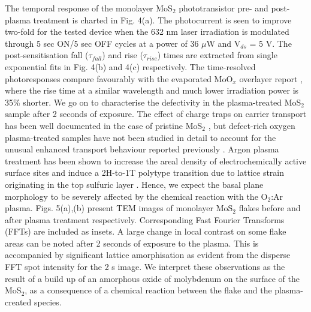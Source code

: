 \documentclass[%
 reprint,
superscriptaddress,
 amsmath,amssymb,
 aps,
prb,
]{revtex4-1}
\begin{document}
\indent The temporal response of the monolayer MoS$_2$ phototransistor pre- and post-plasma treatment is charted in Fig. 4(a). The photocurrent is seen to improve two-fold for the tested device when the 632 nm laser irradiation is modulated through 5 sec ON/5 sec OFF cycles at a power of 36 $\mu$W and V$_{ds}$ = 5 V. The post-sensitisation fall ($\tau_{fall}$) and rise ($\tau_{rise}$) times are extracted from single exponential fits in Fig. 4(b) and 4(c) respectively. The time-resolved photoresponses compare favourably with the evaporated MoO$_x$ overlayer report \cite{Yoo2017}, where the rise time at a similar wavelength and much lower irradiation power is 35\% shorter.  \newline
\indent We go on to characterise the defectivity in the plasma-treated MoS$_2$ sample after 2 seconds of exposure.  The effect of charge traps on carrier transport has been well documented in the case of pristine MoS$_2$ \cite{zhu2014electronic, renteria2014low,yu2016realization,kim2017analysis,yuan2017pbti,yu2017analyzing}, but defect-rich oxygen plasma-treated samples have not been studied in detail to account for the unusual enhanced transport behaviour reported previously \cite{nan2017improving,jadwiszczak2017oxide}. Argon plasma treatment has been shown to increase the areal density of electrochemically active surface sites \cite{tao2015plasma} and induce a 2H-to-1T polytype transition due to lattice strain originating in the top sulfuric layer \cite{zhu2017argon}. Hence, we expect the basal plane morphology to be severely affected by the chemical reaction with the O$_2$:Ar plasma. \newline
\indent Figs. 5(a),(b) present TEM images of monolayer MoS$_2$ flakes before and after plasma treatment respectively. Corresponding Fast Fourier Transforms (FFTs) are included as insets. A large change in local contrast on some flake areas can be noted after 2 seconds of exposure to the plasma. This is accompanied by significant lattice amorphisation as evident from the disperse FFT spot intensity for the 2 s image. We interpret these observations as the result of a build up of an amorphous oxide of molybdenum on the surface of the MoS$_2$, as a consequence of a chemical reaction between the flake and the plasma-created species\cite{ko2016stack,nan2017improving,jadwiszczak2017oxide}.     \newline
\end{document}
